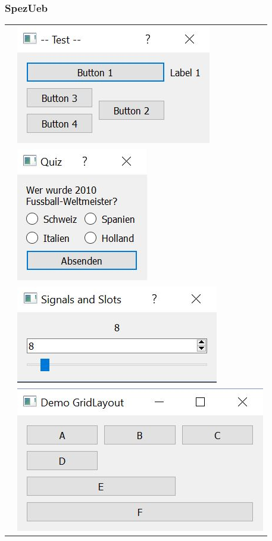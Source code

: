 \subsubsection{SpezUeb}
\begin{longtable}{l l} %
    &
    \includegraphics{images/qtSpezUeb1.jpg}
    \\
    &
    \includegraphics{images/qtSpezUeb2.jpg}
    \\
    &
    \includegraphics{images/qtSpezUeb3.jpg}
    \\
    &
    \includegraphics{images/GridLayout.jpg}    
\end{longtable}
